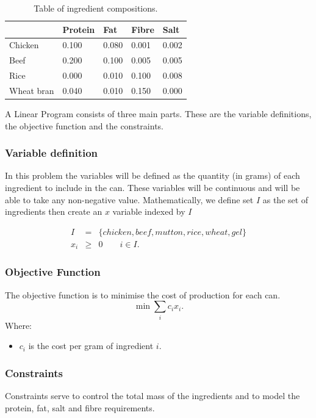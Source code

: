 \documentclass[a4paper,oneside]{arlimsTPPM}
\begin{document}
\begin{table}
\centering
\begin{tabular}{|l|l|l|l|l|}\hline
 		& Protein & Fat   & Fibre & Salt\\\hline
Chicken 	& 0.100 & 0.080   & 0.001 & 0.002\\
Beef 		& 0.200 & 0.100   & 0.005 & 0.005\\
Rice 		& 0.000 & 0.010   & 0.100 & 0.008\\
Wheat bran 	& 0.040 & 0.010   & 0.150 & 0.000\\\hline
\end{tabular}
\caption{Table of ingredient compositions.}
\end{table}

A Linear Program consists of three main parts. These are the variable definitions, the objective function and the constraints.

\subsubsection{Variable definition}
In this problem the variables will be defined as the quantity (in grams) of each ingredient to include in the can. These variables will be continuous and will be able to take any non-negative value. Mathematically, we define set $I$ as the set of ingredients then create an $x$ variable indexed by $I$

\begin{eqnarray*}
I &=& \{chicken, beef, mutton, rice, wheat, gel\}\\
x_i &\ge& 0 \quad \quad i \in I.
\end{eqnarray*}



\subsubsection{Objective Function}
The objective function is to minimise the cost of production for each can.
\[
\min \sum_i c_i x_i.
\]
Where:
\begin{itemize}
 \item $c_i$ is the cost per gram of ingredient $i$.
\end{itemize}



\subsubsection{Constraints}
Constraints serve to control the total mass of the ingredients and to model the protein, fat, salt and fibre requirements.
\end{document}
